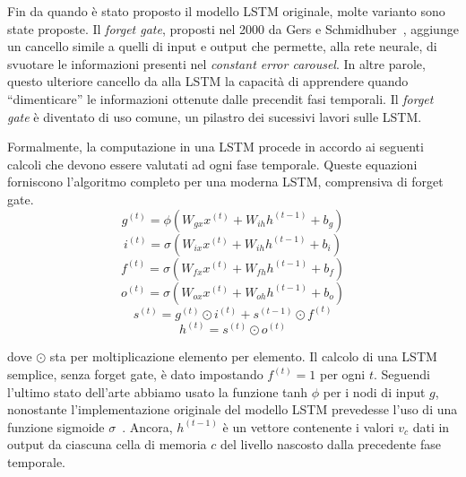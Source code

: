 Fin da quando \`e stato proposto il modello LSTM originale, molte varianto sono state proposte.
Il \emph{forget gate}, proposti nel 2000 da Gers e Schmidhuber~\cite{Gers:2000}, aggiunge un cancello simile a quelli di input e output che permette, alla rete neurale, di svuotare le informazioni presenti nel \emph{constant error carousel}.
In altre parole, questo ulteriore cancello da alla LSTM la capacit\`a di apprendere quando ``dimenticare'' le informazioni ottenute dalle precendit fasi temporali.
Il \emph{forget gate} \`e diventato di uso comune, un pilastro dei sucessivi lavori sulle LSTM.

Formalmente, la computazione in una LSTM procede in accordo ai seguenti calcoli che devono essere valutati ad ogni fase temporale.
Queste equazioni forniscono l'algoritmo completo per una moderna LSTM, comprensiva di forget gate.
\begin{equation}
  g^{(t)} = \phi(W_{gx}x^{(t)} + W_{ih}h^{(t-1)} + b_g)
\end{equation}
\begin{equation}
  i^{(t)} = \sigma(W_{ix}x^{(t)} + W_{ih}h^{(t-1)} + b_i)
\end{equation}
\begin{equation}
  f^{(t)} = \sigma(W_{fx}x^{(t)} + W_{fh}h^{(t-1)} + b_f)
\end{equation}
\begin{equation}
  o^{(t)} = \sigma(W_{ox}x^{(t)} + W_{oh}h^{(t-1)} + b_o)
\end{equation}
\begin{equation}
  s^{(t)} = g^{(t)} \odot i^{(t)} + s^{(t-1)} \odot f^{(t)}
\end{equation}
\begin{equation}
  h^{(t)} = s^{(t)} \odot o^{(t)}
\end{equation}

dove $\odot$ sta per moltiplicazione elemento per elemento.
Il calcolo di una LSTM semplice, senza forget gate, \`e dato impostando $f^{(t)} = 1$ per ogni $t$.
Seguendi l'ultimo stato dell'arte abbiamo usato la funzione tanh $\phi$ per i nodi di input $g$, nonostante l'implementazione originale del modello LSTM prevedesse l'uso di una funzione sigmoide $\sigma$~\cite{Hochreiter:1997}.
Ancora, $h^{(t-1)}$ \`e un vettore contenente i valori $v_c$ dati in output da ciascuna cella di memoria $c$ del livello nascosto dalla precedente fase temporale.

